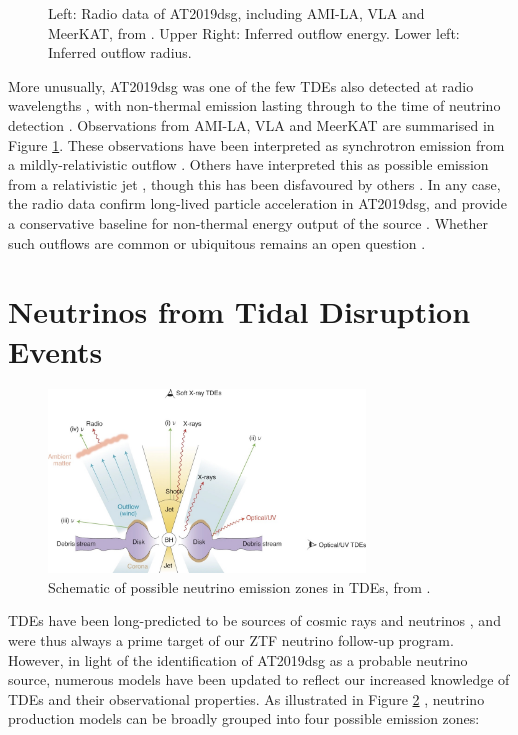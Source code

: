 \documentclass[a4paper,11pt]{article}
\begin{document}
\begin{figure}
\begin{subfigure}{0.45\textwidth}
	\end{subfigure}
	\caption{Left: Radio data of AT2019dsg, including AMI-LA, VLA and MeerKAT, from \cite{bran}. Upper Right: Inferred outflow energy. Lower left: Inferred outflow radius.}
	\label{fig:bran_radio}
\end{figure}

More unusually, AT2019dsg was one of the few TDEs also detected at radio wavelengths \cite{radio_tde_summary}, with non-thermal emission lasting through to the time of neutrino detection \cite{bran}. Observations from AMI-LA, VLA and MeerKAT are summarised in Figure \ref{fig:bran_radio}. These observations have been interpreted as synchrotron emission from a mildly-relativistic outflow \cite{bran, cendes_21, mohan_21, matsumoto_21}. Others have interpreted this as possible emission from a relativistic jet \cite{liu21_bran, winter_bran_21}, though this has been disfavoured by others \cite{mohan_21, cendes_21}. In any case, the radio data confirm long-lived particle acceleration in AT2019dsg, and provide a conservative baseline for non-thermal energy output of the source \cite{bran}. Whether such outflows are common or ubiquitous remains an open question \cite{radio_tde_summary}.

\section{Neutrinos from Tidal Disruption Events}

\begin{figure}[!ht]
	\centering
	\includegraphics[width=0.75\textwidth]{figures/tde_nu}
	\caption{Schematic of possible neutrino emission zones in TDEs, from \cite{hayasaki_21}.}
	\label{fig:tde_nu}
\end{figure}

TDEs have been long-predicted to be sources of cosmic rays and neutrinos \cite{farrar_14}, and were thus always a prime target of our ZTF neutrino follow-up program. However, in light of the identification of AT2019dsg as a probable neutrino source, numerous models have been updated to reflect our increased knowledge of TDEs and their observational properties. As illustrated in Figure \ref{fig:tde_nu} \cite{hayasaki_21}, neutrino production models can be broadly grouped into four possible emission zones:
\end{document}
